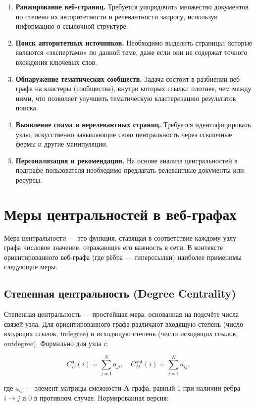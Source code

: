 \documentclass[12pt, a4paper]{article}
\begin{document}
\begin{enumerate}
    \item \textbf{Ранжирование веб-страниц.} Требуется упорядочить множество документов по степени их авторитетности и релевантности запросу, используя информацию о ссылочной структуре.
    \item \textbf{Поиск авторитетных источников.} Необходимо выделить страницы, которые являются «экспертами» по данной теме, даже если они не содержат точного вхождения ключевых слов.
    \item \textbf{Обнаружение тематических сообществ.} Задача состоит в разбиении веб-графа на кластеры (сообщества), внутри которых ссылки плотнее, чем между ними, что позволяет улучшить тематическую кластеризацию результатов поиска.
    \item \textbf{Выявление спама и нерелевантных страниц.} Требуется идентифицировать узлы, искусственно завышающие свою центральность через ссылочные фермы и другие манипуляции.
    \item \textbf{Персонализация и рекомендации.} На основе анализа центральностей в подграфе пользователя необходимо предлагать релевантные документы или ресурсы.
\end{enumerate}

\section{Меры центральностей в веб-графах}

Мера центральности — это функция, ставящая в соответствие каждому узлу графа числовое значение, отражающее его важность в сети. В контексте ориентированного веб-графа (где рёбра — гиперссылки) наиболее применимы следующие меры.

\subsection{Степенная центральность (Degree Centrality)}

Степенная центральность — простейшая мера, основанная на подсчёте числа связей узла. Для ориентированного графа различают входящую степень (число входящих ссылок, indegree) и исходящую степень (число исходящих ссылок, outdegree). Формально для узла $i$:

\[
C_D^{\text{in}}(i) = \sum_{j=1}^{N} a_{ji}, \quad C_D^{\text{out}}(i) = \sum_{j=1}^{N} a_{ij},
\]

где $a_{ij}$ — элемент матрицы смежности $\mathbf{A}$ графа, равный 1 при наличии ребра $i \to j$ и 0 в противном случае. Нормированная версия:
\end{document}
